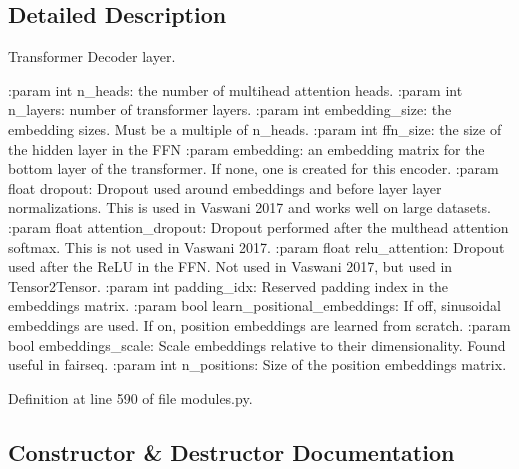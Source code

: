 \subsection{Detailed Description}
\begin{DoxyVerb}Transformer Decoder layer.

:param int n_heads: the number of multihead attention heads.
:param int n_layers: number of transformer layers.
:param int embedding_size: the embedding sizes. Must be a multiple of n_heads.
:param int ffn_size: the size of the hidden layer in the FFN
:param embedding: an embedding matrix for the bottom layer of the transformer.
    If none, one is created for this encoder.
:param float dropout: Dropout used around embeddings and before layer
    layer normalizations. This is used in Vaswani 2017 and works well on
    large datasets.
:param float attention_dropout: Dropout performed after the multhead attention
    softmax. This is not used in Vaswani 2017.
:param float relu_attention: Dropout used after the ReLU in the FFN. Not used
    in Vaswani 2017, but used in Tensor2Tensor.
:param int padding_idx: Reserved padding index in the embeddings matrix.
:param bool learn_positional_embeddings: If off, sinusoidal embeddings are
    used. If on, position embeddings are learned from scratch.
:param bool embeddings_scale: Scale embeddings relative to their dimensionality.
    Found useful in fairseq.
:param int n_positions: Size of the position embeddings matrix.
\end{DoxyVerb}
 

Definition at line 590 of file modules.\+py.



\subsection{Constructor \& Destructor Documentation}
\mbox{\label{classparlai_1_1agents_1_1transformer_1_1modules_1_1TransformerDecoder_ac9356241c0dd44bf980a155124cbde59}} 
